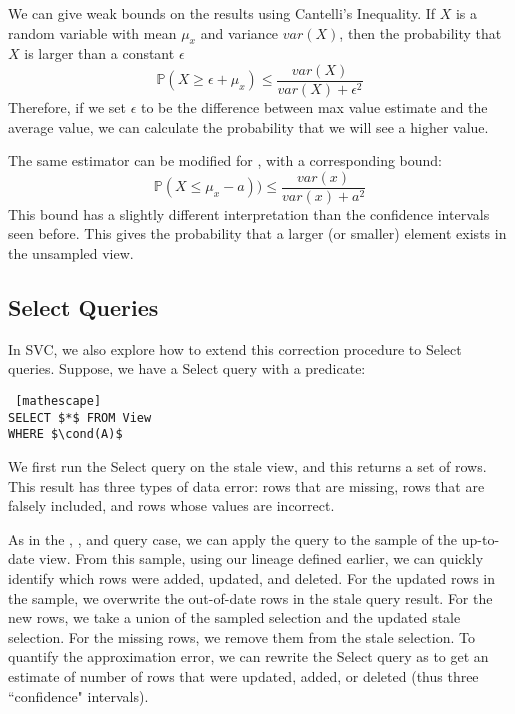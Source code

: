 We can give weak bounds on the results using Cantelli's Inequality.
If $X$ is a random variable with mean $\mu_x$ and variance $var(X)$, then the probability that $X$ is larger than a constant $\epsilon$ 
\[
\mathbb{P}(X \ge \epsilon + \mu_x ) \le \frac{var(X)}{var(X) + \epsilon^2}
\]
Therefore, if we set $\epsilon$ to be the difference between max value estimate and the average value, we can calculate the probability that we will see a higher value. 

The same estimator can be modified for \minfunc, with a corresponding bound:
\[
\mathbb{P}(X \le \mu_x - a )) \le \frac{var(x)}{var(x) + a^2}
\]
This bound has a slightly different interpretation than the confidence intervals seen before.
This gives the probability that a larger (or smaller) element exists in the unsampled view.
\fi

\iffalse
\begin{proposition} (BOOTSTRAP OVER DIFFERENCES) Let q be an aggregate query that has an unbiased sample estimate, and let $\hat{S}$ and $\hat{S'}$ be sample views as defined before. 
One sample of the bootstrap estimator $s$ is defined as the difference of q applied to random subsample of size $b_1$ (with replacement) of $\hat{S}$ and $\hat{S'}$.
We denote subsamples of the samples as $\hat{S'}_{sub}$ and $\hat{S}_{sub}$ respectively.
\[q(\hat{S'}_{sub}) - q(\hat{S}_{sub})\]
To build the confidence interval, we repeatedly apply this procedure $b_2$ times.
\end{proposition}
\fi


\subsection{Select Queries}
In SVC, we also explore how to extend this correction procedure to Select queries.
Suppose, we have a Select query with a predicate:
\begin{lstlisting} [mathescape]
SELECT $*$ FROM View 
WHERE $\cond(A)$
\end{lstlisting}

We first run the Select query on the stale view, and this returns a set of rows.
This result has three types of data error: rows that are missing, rows that are falsely included, and rows whose values are incorrect.

As in the \sumfunc, \countfunc, and \avgfunc query case, we can apply the query to the sample of the up-to-date view.
From this sample, using our lineage defined earlier, we can quickly identify which rows were added, updated, and deleted.
For the updated rows in the sample, we overwrite the out-of-date rows in the stale query result.
For the new rows, we take a union of the sampled selection and the updated stale selection.
For the missing rows, we remove them from the stale selection.
To quantify the approximation error, we can rewrite the Select query as \countfunc to get an estimate of number of rows that were updated, added, or deleted (thus three ``confidence" intervals). 


